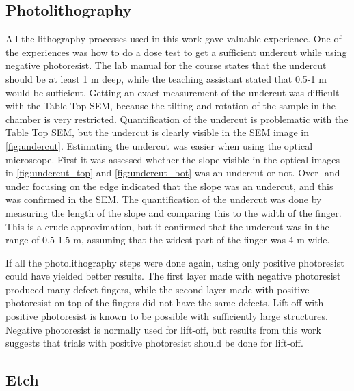 
\subsection{Photolithography}
\label{sec:discussion:photolithography}

\noindent All the lithography processes used in this work gave valuable experience.
One of the experiences was how to do a dose test to get a sufficient undercut while using negative photoresist. 
The lab manual for the course \cite{labmanual} states that the undercut should be at least 1 \textmu m deep, while the teaching assistant stated that 0.5-1 \textmu m would be sufficient.
Getting an exact measurement of the undercut was difficult with the Table Top SEM, because the tilting and rotation of the sample in the chamber is very restricted. 
Quantification of the undercut is problematic with the Table Top SEM, but the undercut is clearly visible in the SEM image in \autoref{fig:undercut}.
Estimating the undercut was easier when using the optical microscope. 
First it was assessed whether the slope visible in the optical images in \autoref{fig:undercut_top} and \autoref{fig:undercut_bot} was an undercut or not.
Over- and under focusing on the edge indicated that the slope was an undercut, and this was confirmed in the SEM. 
The quantification of the undercut was done by measuring the length of the slope and comparing this to the width of the finger. 
This is a crude approximation, but it confirmed that the undercut was in the range of 0.5-1.5 \textmu m, assuming that the widest part of the finger was 4 \textmu m wide.


If all the photolithography steps were done again, using only positive photoresist could have yielded better results.
The first layer made with negative photoresist produced many defect fingers, while the second layer made with positive photoresist on top of the fingers did not have the same defects.
Lift-off with positive photoresist is known to be possible with sufficiently large structures. 
Negative photoresist is normally used for lift-off, but results from this work suggests that trials with positive photoresist should be done for lift-off. 


\subsection{Etch}
\label{sec:discussion:etch}

